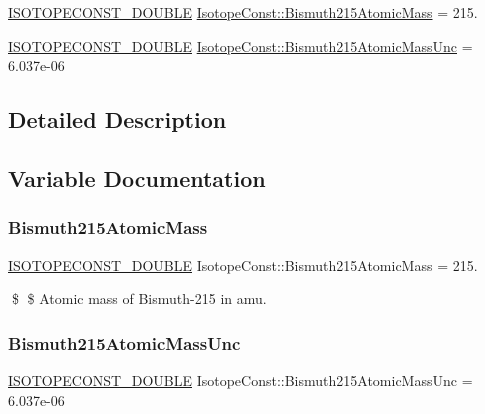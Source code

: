 \begin{DoxyCompactItemize}
\item 
\mbox{\hyperlink{group___isotope_const-_macros_ga8f45a7272ce02c0b4c65c44636ed719a}{I\+S\+O\+T\+O\+P\+E\+C\+O\+N\+S\+T\+\_\+\+D\+O\+U\+B\+LE}} \mbox{\hyperlink{group___isotope_const-_bismuth-_bi215_ga8275bb4fc93d30aa4c6a7a951b68ca52}{Isotope\+Const\+::\+Bismuth215\+Atomic\+Mass}} = 215.
\item 
\mbox{\hyperlink{group___isotope_const-_macros_ga8f45a7272ce02c0b4c65c44636ed719a}{I\+S\+O\+T\+O\+P\+E\+C\+O\+N\+S\+T\+\_\+\+D\+O\+U\+B\+LE}} \mbox{\hyperlink{group___isotope_const-_bismuth-_bi215_gae51fb9eca79e22c048ccfedaa785870c}{Isotope\+Const\+::\+Bismuth215\+Atomic\+Mass\+Unc}} = 6.\+037e-\/06
\end{DoxyCompactItemize}


\subsection{Detailed Description}


\subsection{Variable Documentation}
\mbox{\label{group___isotope_const-_bismuth-_bi215_ga8275bb4fc93d30aa4c6a7a951b68ca52}} 
\subsubsection{\texorpdfstring{Bismuth215\+Atomic\+Mass}{Bismuth215AtomicMass}}
{\footnotesize\ttfamily \mbox{\hyperlink{group___isotope_const-_macros_ga8f45a7272ce02c0b4c65c44636ed719a}{I\+S\+O\+T\+O\+P\+E\+C\+O\+N\+S\+T\+\_\+\+D\+O\+U\+B\+LE}} Isotope\+Const\+::\+Bismuth215\+Atomic\+Mass = 215.}

\$ \$ Atomic mass of Bismuth-\/215 in amu. \mbox{\label{group___isotope_const-_bismuth-_bi215_gae51fb9eca79e22c048ccfedaa785870c}} 
\subsubsection{\texorpdfstring{Bismuth215\+Atomic\+Mass\+Unc}{Bismuth215AtomicMassUnc}}
{\footnotesize\ttfamily \mbox{\hyperlink{group___isotope_const-_macros_ga8f45a7272ce02c0b4c65c44636ed719a}{I\+S\+O\+T\+O\+P\+E\+C\+O\+N\+S\+T\+\_\+\+D\+O\+U\+B\+LE}} Isotope\+Const\+::\+Bismuth215\+Atomic\+Mass\+Unc = 6.\+037e-\/06}


